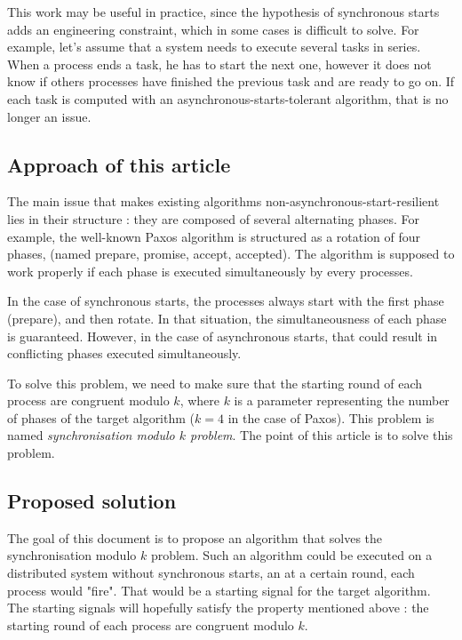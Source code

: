 \documentclass{article}
\begin{document}
This work may be useful in practice, since the hypothesis of synchronous starts adds an engineering constraint, which in some cases is difficult to solve.
For example, let's assume that a system needs to execute several tasks in series.
When a process ends a task, he has to start the next one, however it does not know if others processes have finished the previous task and are ready to go on.
If each task is computed with an asynchronous-starts-tolerant algorithm, that is no longer an issue.

\subsection{Approach of this article}

The main issue that makes existing algorithms non-asynchronous-start-resilient lies in their structure :
they are composed of several alternating phases.
For example, the well-known Paxos algorithm is structured as a rotation of four phases, (named prepare,
promise, accept, accepted).
The algorithm is supposed to work properly if each phase is executed simultaneously by every processes.

In the case of synchronous starts, the processes always start with the first phase (prepare), and then rotate.
In that situation, the simultaneousness of each phase is guaranteed.
However, in the case of asynchronous starts, that could result in conflicting phases executed simultaneously.

To solve this problem, we need to make sure that the starting round of each process are congruent modulo $k$,
where $k$ is a parameter representing the number of phases of the target algorithm ($k=4$ in the case of Paxos).
This problem is named \emph{synchronisation modulo $k$ problem}.
The point of this article is to solve this problem.

\subsection{Proposed solution}

The goal of this document is to propose an algorithm that solves the synchronisation modulo $k$ problem.
Such an algorithm could be executed on a distributed system without synchronous starts,
an at a certain round, each process would "fire".
That would be a starting signal for the target algorithm.
The starting signals will hopefully satisfy the property mentioned above :
the starting round of each process are congruent modulo $k$.
\end{document}
